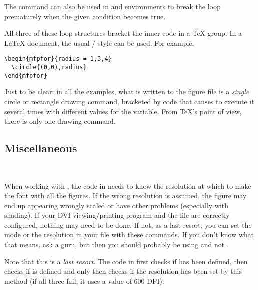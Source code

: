 \documentclass[letterpaper]{article}
\begin{document}
The command  can also be used in  and
 environments to break the loop prematurely when the given
condition becomes true.

All three of these loop structures bracket the inner code in a \TeX{}
group. In a \LaTeX{} document, the usual \slash{} style can
be used. For example,
\begin{verbatim}
\begin{mfpfor}{radius = 1,3,4}
  \circle{(0,0),radius}
\end{mfpfor}
\end{verbatim}

Just to be clear: in all the examples, what is written to the figure
file is a \emph{single} circle or rectangle drawing command, bracketed
by code that causes \MF{} to execute it several times with different
values for the variable. From \TeX{}'s point of view, there is only one
\mfp{} drawing command.


\subsection{Miscellaneous}\label{misc}

\begin{cd}
\\
%
\end{cd}

When working with \MF{}, the code in  needs to know
the resolution at which to make the font with all the figures. If the
wrong resolution is assumed, the figure may end up appearing wrongly
scaled or have other problems (especially with shading). If your DVI
viewing/printing program and the file  are correctly
configured, nothing may need to be done. If not, as a last resort, you
can set the \MF{} mode or the \MF{} resolution in your  file
with these commands. If you don't know what that means, ask a guru, but
then you should probably be using \MP{} and not \MF{}.

Note that this is a \emph{last resort}. The code in 
first checks if  has been defined, then checks if
 is defined and only then checks if the resolution has
been set by this method (if all three fail, it uses a value of 600 DPI).

\begin{cd}
\\%
\\%
%
%
%
\end{cd}
\end{document}
